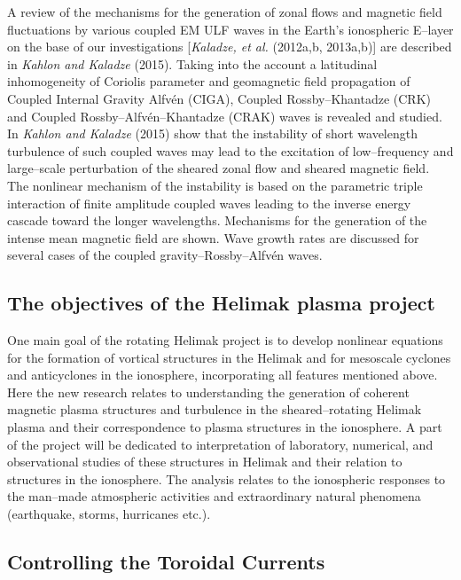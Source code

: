 \documentclass[a4paper,openany,12pt]{report}
\begin{document}
A review of the mechanisms for the generation of zonal flows and magnetic field fluctuations by various coupled EM ULF waves in the Earth's ionospheric E--layer on the base of our investigations [\emph{Kaladze, et al.} (2012a,b, 2013a,b)] are described in \emph{Kahlon and Kaladze} (2015). Taking into the account a latitudinal inhomogeneity of Coriolis parameter and geomagnetic field propagation of Coupled Internal Gravity Alfv\'en (CIGA), Coupled Rossby--Khantadze (CRK) and Coupled Rossby--Alfv\'en--Khantadze (CRAK) waves is revealed and studied. In \emph{Kahlon and Kaladze} (2015) show that the instability of short wavelength turbulence of such coupled waves may lead to the excitation of low--frequency and large--scale perturbation of the sheared zonal flow and sheared magnetic field. The nonlinear mechanism of the instability is based on the parametric triple interaction of finite amplitude coupled waves leading to the inverse energy cascade toward the longer wavelengths. Mechanisms for the generation of the intense mean magnetic field are shown. Wave growth rates are discussed for several cases of the coupled  gravity--Rossby--Alfv\'en waves.

\subsection*{The objectives of the Helimak plasma project}

One main goal of the rotating Helimak project is to develop nonlinear equations for the formation of vortical structures in the Helimak and for mesoscale cyclones and anticyclones in the ionosphere, incorporating all features mentioned above. Here the new research relates to understanding the generation of coherent magnetic plasma structures and turbulence in the sheared--rotating Helimak plasma and their correspondence to plasma structures in the ionosphere. A part of the project will be dedicated to interpretation of laboratory, numerical, and observational studies of these structures in Helimak and their relation to structures in the ionosphere. The analysis relates to the ionospheric responses to the man--made atmospheric activities and extraordinary natural phenomena (earthquake, storms, hurricanes etc.).\\

\subsection{Controlling the Toroidal Currents}
\end{document}
